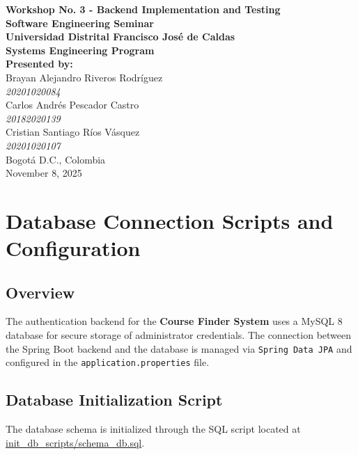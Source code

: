 \documentclass[12pt,a4paper]{article}
\begin{document}
\begin{titlepage}
    \centering
    \vspace*{2cm}
    
    {\Huge \textbf{Workshop No. 3 - Backend Implementation and Testing}}\\[1.2cm]
    {\LARGE \textbf{Software Engineering Seminar}}\\[0.5cm]
    {\Large \textbf{Universidad Distrital Francisco José de Caldas}}\\[0.2cm]
    {\large \textbf{Systems Engineering Program}}\\[2cm]


    {\Large \textbf{Presented by:}}\\[0.5cm]
    {\large Brayan Alejandro Riveros Rodríguez \\ \textit{20201020084}}\\[0.3cm]
    {\large Carlos Andrés Pescador Castro \\ \textit{20182020139}}\\[0.3cm]
    {\large Cristian Santiago Ríos Vásquez \\ \textit{20201020107}}\\[2cm]

    {\Large Bogotá D.C., Colombia}\\[0.3cm]
    {\large November 8, 2025}
    
    \vfill
\end{titlepage}


\section{Database Connection Scripts and Configuration}

\subsection{Overview}
The authentication backend for the \textbf{Course Finder System} uses a MySQL 8 database for secure storage of administrator credentials. 
The connection between the Spring Boot backend and the database is managed via \texttt{Spring Data JPA} and configured in the 
\texttt{application.properties} file.

\subsection{Database Initialization Script}
The database schema is initialized through the SQL script located at \url{init_db_scripts/schema_db.sql}. \\ 
\end{document}
